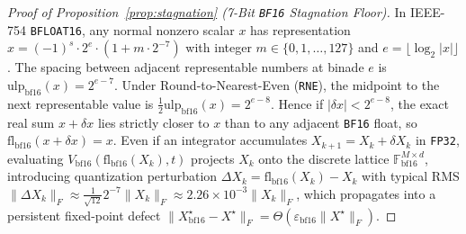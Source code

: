 \documentclass[11pt,a4paper]{article}
\theoremstyle{definition}
\theoremstyle{remark}
\newcommand{\bfsixteen}{\texttt{BF16}}
\newcommand{\fpthirtytwo}{\texttt{FP32}}
\newcommand{\epsbf}{\varepsilon_{\mathrm{bf16}}}
\begin{document}
\begin{proof}[Proof of Proposition~\ref{prop:stagnation} (7-Bit \bfsixteen{} Stagnation Floor)]
In IEEE-754 \texttt{BFLOAT16}, any normal nonzero scalar $x$ has representation $x = (-1)^s \cdot 2^{e} \cdot (1 + m \cdot 2^{-7})$ with integer $m \in \{0, 1, \dots, 127\}$ and $e = \lfloor \log_2 |x| \rfloor$. The spacing between adjacent representable numbers at binade $e$ is $\mathrm{ulp}_{\mathrm{bf16}}(x) = 2^{e - 7}$. Under Round-to-Nearest-Even (\texttt{RNE}), the midpoint to the next representable value is $\frac{1}{2}\mathrm{ulp}_{\mathrm{bf16}}(x) = 2^{e-8}$. Hence if $|\delta x| < 2^{e-8}$, the exact real sum $x + \delta x$ lies strictly closer to $x$ than to any adjacent \bfsixteen{} float, so $\mathrm{fl}_{\mathrm{bf16}}(x + \delta x) = x$. Even if an integrator accumulates $X_{k+1} = X_k + \delta X_k$ in \fpthirtytwo{}, evaluating $V_{\mathrm{bf16}}(\mathrm{fl}_{\mathrm{bf16}}(X_k), t)$ projects $X_k$ onto the discrete lattice $\mathbb{F}_{\mathrm{bf16}}^{M \times d}$, introducing quantization perturbation $\Delta X_k = \mathrm{fl}_{\mathrm{bf16}}(X_k) - X_k$ with typical RMS $\|\Delta X_k\|_F \approx \frac{1}{\sqrt{12}} 2^{-7} \|X_k\|_F \approx 2.26 \times 10^{-3}\|X_k\|_F$, which propagates into a persistent fixed-point defect $\|X_{\mathrm{bf16}}^\star - X^\star\|_F = \Theta(\epsbf \|X^\star\|_F)$.
\end{proof}
\end{document}
